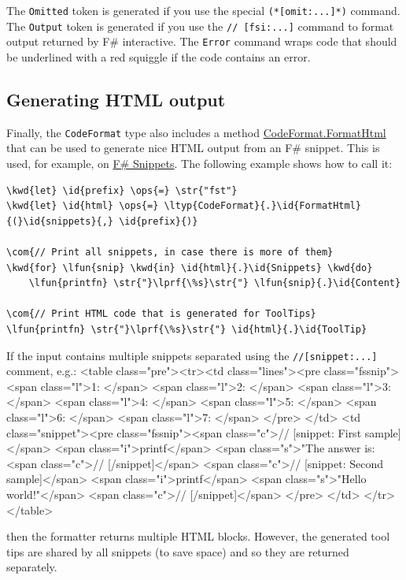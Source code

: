 \documentclass{article}
\newcommand{\id}[1]{\textcolor{black}{#1}}
\newcommand{\com}[1]{\textcolor{officegreen}{#1}}
\newcommand{\kwd}[1]{\textcolor{navy}{#1}}
\newcommand{\ops}[1]{\textcolor{purple}{#1}}
\newcommand{\str}[1]{\textcolor{olive}{#1}}
\begin{document}
The \texttt{Omitted} token is generated if you use the special \texttt{(*[omit:...]*)} command.
The \texttt{Output} token is generated if you use the \texttt{// [fsi:...]} command to format
output returned by F\# interactive. The \texttt{Error} command wraps code that should be
underlined with a red squiggle if the code contains an error.
\subsection*{Generating HTML output}



Finally, the \texttt{CodeFormat} type also includes a method \href{https://fsprojects.github.io/FSharp.Formatting/reference/fsharp-formatting-codeformat-codeformat.html}{CodeFormat.FormatHtml} that can be used
to generate nice HTML output from an F\# snippet. This is used, for example, on
\href{http://www.fssnip.net}{F\# Snippets}. The following example shows how to call it:
\begin{Verbatim}[commandchars=\\\{\}]
\kwd{let} \id{prefix} \ops{=} \str{"fst"}
\kwd{let} \id{html} \ops{=} \ltyp{CodeFormat}{.}\id{FormatHtml}{(}\id{snippets}{,} \id{prefix}{)}

\com{// Print all snippets, in case there is more of them}
\kwd{for} \lfun{snip} \kwd{in} \id{html}{.}\id{Snippets} \kwd{do}
    \lfun{printfn} \str{"}\lprf{\%s}\str{"} \lfun{snip}{.}\id{Content}

\com{// Print HTML code that is generated for ToolTips}
\lfun{printfn} \str{"}\lprf{\%s}\str{"} \id{html}{.}\id{ToolTip}
\end{Verbatim}



If the input contains multiple snippets separated using the \texttt{//[snippet:...]} comment, e.g.:
<table class="pre"><tr><td class="lines"><pre class="fssnip">
<span class="l">1: </span>
<span class="l">2: </span>
<span class="l">3: </span>
<span class="l">4: </span>
<span class="l">5: </span>
<span class="l">6: </span>
<span class="l">7: </span>
</pre>
</td>
<td class="snippet"><pre class="fssnip"><span class="c">// [snippet: First sample]</span>
<span class="i">printf</span> <span class="s">"The answer is: %
<span class="c">// [/snippet]</span>
<span class="c">// [snippet: Second sample]</span>
<span class="i">printf</span> <span class="s">"Hello world!"</span>
<span class="c">// [/snippet]</span>
</pre>
</td>
</tr>
</table>


then the formatter returns multiple HTML blocks. However, the generated tool tips
are shared by all snippets (to save space) and so they are returned separately.
\end{document}
